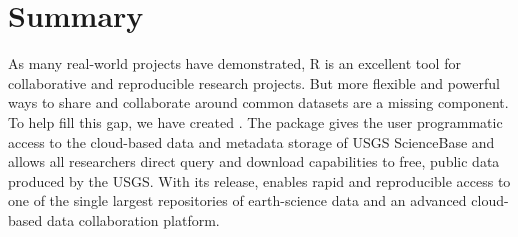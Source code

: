 \section{Summary}

As many real-world projects have demonstrated, R is
an excellent tool for collaborative and reproducible
research projects. But more flexible and powerful
ways to share and collaborate around common datasets
are a missing component. To help fill this gap, we
have created . The  package
gives the user programmatic access to the
cloud-based data and metadata storage of USGS ScienceBase
and allows all researchers direct query and download
capabilities to free, public data produced by the USGS.
With its release,  enables rapid and reproducible
access to one of the single
largest repositories of earth-science data and an advanced
cloud-based data collaboration platform.
